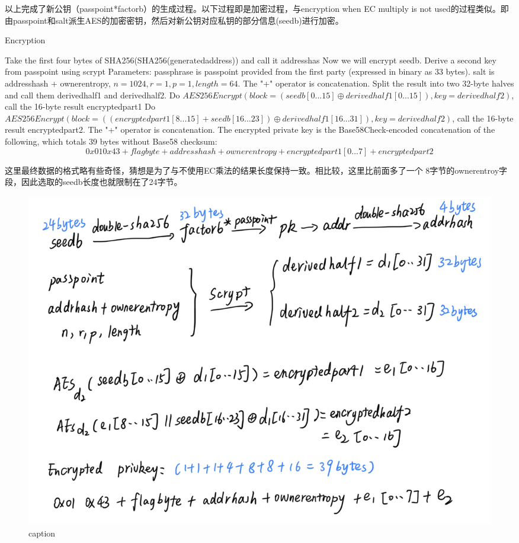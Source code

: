 以上完成了新公钥（passpoint*factorb）的生成过程。以下过程即是加密过程，与encryption when EC multiply is not used的过程类似。即由passpoint和salt派生AES的加密密钥，然后对新公钥对应私钥的部分信息(seedb)进行加密。

\begin{algorithm}[tbp]\footnotesize
\caption{Encryption}
  	\begin{algorithmic}[1]
	    \STATE Take the first four bytes of SHA256(SHA256(generatedaddress)) 
	    and call it addresshas
	    \STATE Now we will encrypt seedb. Derive a second key from passpoint 
	    using scrypt 
		\STATE Parameters: passphrase is passpoint provided from the first 
		party (expressed in binary as 33 bytes). 
		salt is addresshash + ownerentropy, $n=1024, r=1, p=1, length=64$. 
		The "+" operator is concatenation.
		\STATE Split the result into two 32-byte halves and call them derivedhalf1 
		and derivedhalf2.
		\STATE Do $AES256Encrypt(block = (seedb[0...15] \oplus derivedhalf1[0...15]), 
		key = derivedhalf2)$, call the 16-byte result encryptedpart1
		\STATE Do $AES256Encrypt(block = ((encryptedpart1[8...15] + seedb[16...23]) 
		\oplus derivedhalf1[16...31]), key = derivedhalf2)$, call the 16-byte result 
		encryptedpart2. The "+" operator is concatenation.
		\STATE The encrypted private key is the Base58Check-encoded concatenation of 
		the following, which totals 39 bytes without Base58 checksum: 
		$$0x01 0x43 + flagbyte + addresshash + ownerentropy +  encryptedpart1[0...7] + 
		encryptedpart2$$
    \end{algorithmic}
\end{algorithm}

这里最终数据的格式略有些奇怪，猜想是为了与不使用EC乘法的结果长度保持一致。相比较，这里比前面多了一个
8字节的ownerentroy字段，因此选取的seedb长度也就限制在了24字节。

\begin{figure}[h]
\centering
\includegraphics[width=.7\textwidth]{./ec.png}
\caption{caption}\label{fig-parsesig}
\end{figure}

